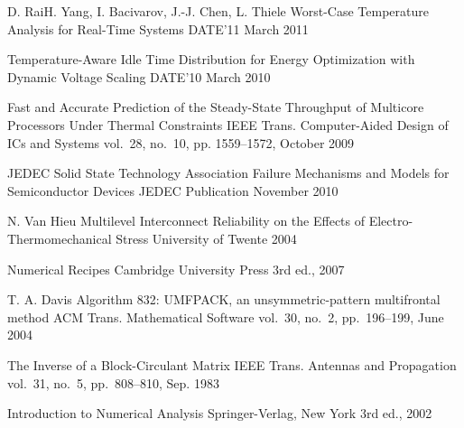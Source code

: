 \begin{thebibliography}{99}
    \publication
      {D. Rai}{H. Yang, I. Bacivarov, J.-J. Chen, L. Thiele}
      {Worst-Case Temperature Analysis for Real-Time Systems}
      {DATE'11}
      {March 2011}

    \publication
      {}
      {Temperature-Aware Idle Time Distribution for Energy Optimization with Dynamic Voltage Scaling}
      {DATE'10}
      {March 2010}

    \publication
      {}
      {Fast and Accurate Prediction of the Steady-State Throughput of Multicore Processors Under Thermal Constraints}
      {IEEE Trans. Computer-Aided Design of ICs and Systems}
      {vol.~28, no.~10, pp. 1559--1572, October 2009}

    \publication
      {JEDEC Solid State Technology Association}
      {Failure Mechanisms and Models for Semiconductor Devices}
      {JEDEC Publication}
      {November 2010}

    \publication
      {N. Van Hieu}
      {Multilevel Interconnect Reliability on the Effects of Electro-Thermomechanical Stress}
      {University of Twente}
      {2004}

    \publication
      {}
      {Numerical Recipes}
      {Cambridge University Press}
      {3rd ed., 2007}

    \publication
      {T. A. Davis}
      {Algorithm 832: UMFPACK, an unsymmetric-pattern multifrontal method}
      {ACM Trans. Mathematical Software}
      {vol.~30, no.~2, pp.~196--199, June 2004}

    \publication
      {}
      {The Inverse of a Block-Circulant Matrix}
      {IEEE Trans. Antennas and Propagation}
      {vol.~31, no.~5, pp.~808--810, Sep. 1983}


    \publication
      {}
      {Introduction to Numerical Analysis}
      {Springer-Verlag, New York}
      {3rd ed., 2002}


\end{thebibliography}
